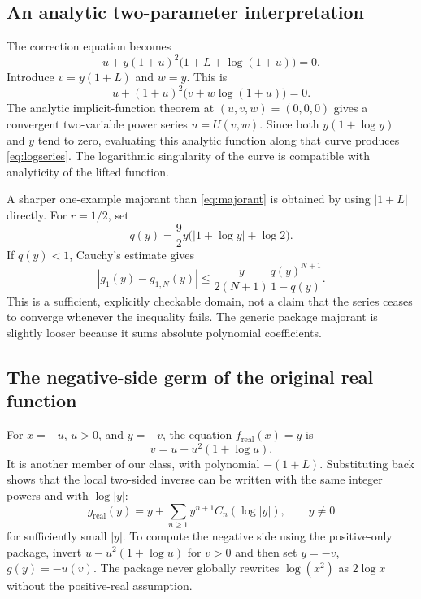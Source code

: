 \documentclass[11pt,a4paper]{article}
\theoremstyle{definition}
\begin{document}
\subsection{An analytic two-parameter interpretation}
The correction equation becomes
\[
 u+y(1+u)^2\bigl(1+L+\log(1+u)\bigr)=0.
\]
Introduce \(v=y(1+L)\) and \(w=y\). This is
\begin{equation}\label{eq:two-parameter}
 u+(1+u)^2\bigl(v+w\log(1+u)\bigr)=0.
\end{equation}
The analytic implicit-function theorem at \((u,v,w)=(0,0,0)\) gives a
convergent two-variable power series \(u=U(v,w)\). Since both
\(y(1+\log y)\) and \(y\) tend to zero, evaluating this analytic function
along that curve produces \eqref{eq:logseries}. The logarithmic singularity
of the curve is compatible with analyticity of the lifted function.

A sharper one-example majorant than \eqref{eq:majorant} is obtained by using
\(|1+L|\) directly. For \(r=1/2\), set
\begin{equation}\label{eq:logq}
 q(y)=\frac92 y\bigl(|1+\log y|+\log2\bigr).
\end{equation}
If \(q(y)<1\), Cauchy's estimate gives
\begin{equation}\label{eq:logbound}
 |g_1(y)-g_{1,N}(y)|\le
 \frac{y}{2(N+1)}\frac{q(y)^{N+1}}{1-q(y)}.
\end{equation}
This is a sufficient, explicitly checkable domain, not a claim that the
series ceases to converge whenever the inequality fails. The generic package
majorant is slightly looser because it sums absolute polynomial coefficients.

\subsection{The negative-side germ of the original real function}
For \(x=-u\), \(u>0\), and \(y=-v\), the equation
\(f_{\mathrm{real}}(x)=y\) is
\[
 v=u-u^2(1+\log u).
\]
It is another member of our class, with polynomial \(-(1+L)\). Substituting
back shows that the local two-sided inverse can be written with the same
integer powers and with \(\log|y|\):
\[
 g_{\mathrm{real}}(y)=y+\sum_{n\ge1}y^{n+1}C_n(\log|y|),\qquad y\ne0
\]
for sufficiently small \(|y|\). To compute the negative side using the
positive-only package, invert \(u-u^2(1+\log u)\) for \(v>0\) and then set
\(y=-v\), \(g(y)=-u(v)\). The package never globally rewrites
\(\log(x^2)\) as \(2\log x\) without the positive-real assumption.
\end{document}
